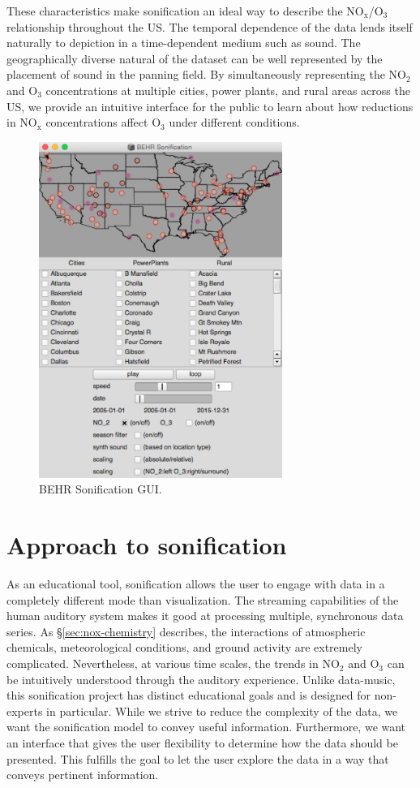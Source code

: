 \documentclass[a4paper,10pt,oneside]{article}
\newcommand{\ce}[1]{$\mathrm{#1}$}
\begin{document}
\begin{sloppy}
These characteristics make sonification an ideal way to describe the \ce{NO_x}/\ce{O_3} relationship throughout the US. The temporal dependence of the data lends itself naturally to depiction in a time-dependent medium such as sound. The geographically diverse natural of the dataset can be well represented by the placement of sound in the panning field. By simultaneously representing the \ce{NO_2} and \ce{O_3} concentrations at multiple cities, power plants, and rural areas across the US, we provide an intuitive interface for the public to learn about how reductions in \ce{NO_x} concentrations affect \ce{O_3} under different conditions.
	
\begin{figure}[t]
\centering
\includegraphics[width=300px]{figs/gui.png}
\caption{BEHR Sonification GUI.}
\label{fig:gui}
\end{figure}

\section{Approach to sonification}
As an educational tool, sonification allows the user to engage with data in a completely different mode than visualization. The streaming capabilities of the human auditory system makes it good at processing multiple, synchronous data series. As \S \ref{sec:nox-chemistry} describes, the interactions of atmospheric chemicals, meteorological conditions, and ground activity are extremely complicated. Nevertheless, at various time scales, the trends in \ce{NO_2} and \ce{O_3} can be intuitively understood through the auditory experience. Unlike data-music, this sonification project has distinct educational goals and is designed for non-experts in particular. While we strive to reduce the complexity of the data, we want the sonification model to convey useful information.  Furthermore, we want an interface that gives the user flexibility to determine how the data should be presented.  This fulfills the goal to let the user explore the data in a way that conveys pertinent information.  


\end{sloppy}
\end{document}
